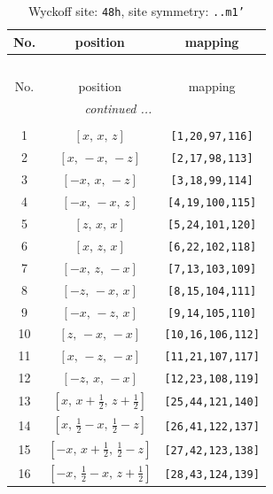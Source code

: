 \documentclass[fleqn,8pt]{jsarticle}
\begin{document}
\begin{longtable}{ccc}
\caption{Wyckoff site: {\tt 48h}, site symmetry: {\tt ..m1'}}
 \\
 \hline \hline
No. & position & mapping \\ \hline \endfirsthead

\multicolumn{2}{l}{\tablename\ \thetable{}} \\
 \hline \hline
No. & position & mapping \\ \hline \endhead

 \hline \hline
\multicolumn{2}{r}{\footnotesize\it continued ...} \\ \endfoot

 \hline \hline
\multicolumn{2}{r}{} \\ \endlastfoot

1 & $\left[ x,\, x,\, z \right]$ & {\tt [1,20,97,116]} \\ \hline
2 & $\left[ x,\, - x,\, - z \right]$ & {\tt [2,17,98,113]} \\ \hline
3 & $\left[ - x,\, x,\, - z \right]$ & {\tt [3,18,99,114]} \\ \hline
4 & $\left[ - x,\, - x,\, z \right]$ & {\tt [4,19,100,115]} \\ \hline
5 & $\left[ z,\, x,\, x \right]$ & {\tt [5,24,101,120]} \\ \hline
6 & $\left[ x,\, z,\, x \right]$ & {\tt [6,22,102,118]} \\ \hline
7 & $\left[ - x,\, z,\, - x \right]$ & {\tt [7,13,103,109]} \\ \hline
8 & $\left[ - z,\, - x,\, x \right]$ & {\tt [8,15,104,111]} \\ \hline
9 & $\left[ - x,\, - z,\, x \right]$ & {\tt [9,14,105,110]} \\ \hline
10 & $\left[ z,\, - x,\, - x \right]$ & {\tt [10,16,106,112]} \\ \hline
11 & $\left[ x,\, - z,\, - x \right]$ & {\tt [11,21,107,117]} \\ \hline
12 & $\left[ - z,\, x,\, - x \right]$ & {\tt [12,23,108,119]} \\ \hline
13 & $\left[ x,\, x + \frac{1}{2},\, z + \frac{1}{2} \right]$ & {\tt [25,44,121,140]} \\ \hline
14 & $\left[ x,\, \frac{1}{2} - x,\, \frac{1}{2} - z \right]$ & {\tt [26,41,122,137]} \\ \hline
15 & $\left[ - x,\, x + \frac{1}{2},\, \frac{1}{2} - z \right]$ & {\tt [27,42,123,138]} \\ \hline
16 & $\left[ - x,\, \frac{1}{2} - x,\, z + \frac{1}{2} \right]$ & {\tt [28,43,124,139]} \\ \hline

\end{longtable}
\end{document}
